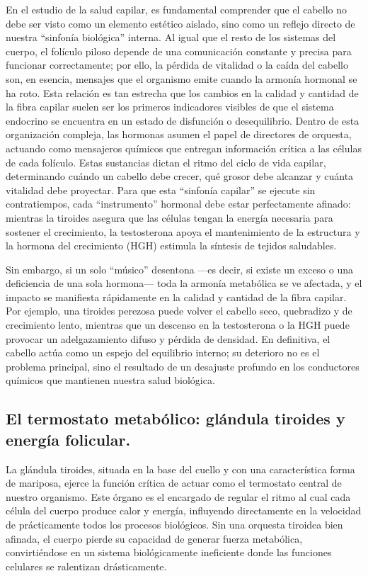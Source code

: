\documentclass[
  spanish,
]{article}
\begin{document}
En el estudio de la salud capilar, es fundamental comprender que el cabello no debe ser visto como un elemento estético aislado, sino como un reflejo directo de nuestra ``sinfonía biológica'' interna. Al igual que el resto de los sistemas del cuerpo, el folículo piloso depende de una comunicación constante y precisa para funcionar correctamente; por ello, la pérdida de vitalidad o la caída del cabello son, en esencia, mensajes que el organismo emite cuando la armonía hormonal se ha roto. Esta relación es tan estrecha que los cambios en la calidad y cantidad de la fibra capilar suelen ser los primeros indicadores visibles de que el sistema endocrino se encuentra en un estado de disfunción o desequilibrio.
Dentro de esta organización compleja, las hormonas asumen el papel de directores de orquesta, actuando como mensajeros químicos que entregan información crítica a las células de cada folículo. Estas sustancias dictan el ritmo del ciclo de vida capilar, determinando cuándo un cabello debe crecer, qué grosor debe alcanzar y cuánta vitalidad debe proyectar. Para que esta ``sinfonía capilar'' se ejecute sin contratiempos, cada ``instrumento'' hormonal debe estar perfectamente afinado: mientras la tiroides asegura que las células tengan la energía necesaria para sostener el crecimiento, la testosterona apoya el mantenimiento de la estructura y la hormona del crecimiento (HGH) estimula la síntesis de tejidos saludables.

Sin embargo, si un solo ``músico'' desentona ---es decir, si existe un exceso o una deficiencia de una sola hormona--- toda la armonía metabólica se ve afectada, y el impacto se manifiesta rápidamente en la calidad y cantidad de la fibra capilar. Por ejemplo, una tiroides perezosa puede volver el cabello seco, quebradizo y de crecimiento lento, mientras que un descenso en la testosterona o la HGH puede provocar un adelgazamiento difuso y pérdida de densidad. En definitiva, el cabello actúa como un espejo del equilibrio interno; su deterioro no es el problema principal, sino el resultado de un desajuste profundo en los conductores químicos que mantienen nuestra salud biológica.

\subsection{El termostato metabólico: glándula tiroides y energía folicular.}\label{el-termostato-metabuxf3lico-gluxe1ndula-tiroides-y-energuxeda-folicular.}

La glándula tiroides, situada en la base del cuello y con una característica forma de mariposa, ejerce la función crítica de actuar como el termostato central de nuestro organismo. Este órgano es el encargado de regular el ritmo al cual cada célula del cuerpo produce calor y energía, influyendo directamente en la velocidad de prácticamente todos los procesos biológicos. Sin una orquesta tiroidea bien afinada, el cuerpo pierde su capacidad de generar fuerza metabólica, convirtiéndose en un sistema biológicamente ineficiente donde las funciones celulares se ralentizan drásticamente.
\end{document}
